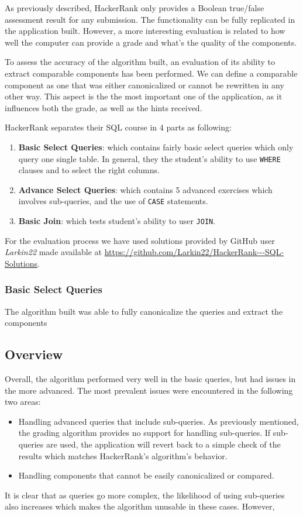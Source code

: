 As previously described, HackerRank only provides a Boolean true/false assessment result for any submission. The functionality can be fully replicated in the application built. However, a more interesting evaluation is related to how well the computer can provide a grade and what's the quality of the components.

To assess the accuracy of the algorithm built, an evaluation of its ability to extract comparable components has been performed. We can define  a comparable component as one that was either canonicalized or cannot be rewritten in any other way. This aspect is the the most important one of the application, as it influences both the grade, as well as the hints received.

HackerRank separates their SQL course in 4 parts as following:
\begin{enumerate}
    \item \textbf{Basic Select Queries}: which contains fairly basic select queries which only query one single table. In general, they the student's ability to use \texttt{WHERE} clauses and to select the right columns.
    \item \textbf{Advance Select Queries}: which contains 5 advanced exercises which involves sub-queries, and the use of \texttt{CASE} statements.
    \item \textbf{Basic Join}: which tests student's ability to user \texttt{JOIN}.
\end{enumerate}

For the evaluation process we have used solutions provided by GitHub user \textit{Larkin22} made available at \url{https://github.com/Larkin22/HackerRank---SQL-Solutions}.

\subsubsection{Basic Select Queries}

The algorithm built was able to fully canonicalize the queries and extract the components

\subsection{Overview}

Overall, the algorithm performed very well in the basic queries, but had issues in the more advanced. The most prevalent issues were encountered in the following two areas:
\begin{itemize}
    \item Handling advanced queries that include sub-queries. As previously mentioned, the grading algorithm provides no support for handling sub-queries. If sub-queries are used, the application will revert back to a simple check of the results which matches HackerRank's algorithm's behavior.
    \item Handling components that cannot be easily canonicalized or compared.
\end{itemize}

It is clear that as queries go more complex, the likelihood of using sub-queries also increases which makes the algorithm unusable in these cases. However,
